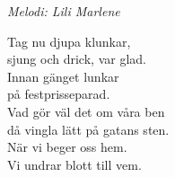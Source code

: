 {\footnotesize\textit{Melodi: Lili Marlene}}\par
\vspace{10pt}
Tag nu djupa klunkar,\\
sjung och drick, var glad.\\
Innan gänget lunkar\\
på festprisseparad.\\
Vad gör väl det om våra ben\\
då vingla lätt på gatans sten.\\
När vi beger oss hem.\\
Vi undrar blott till vem.
